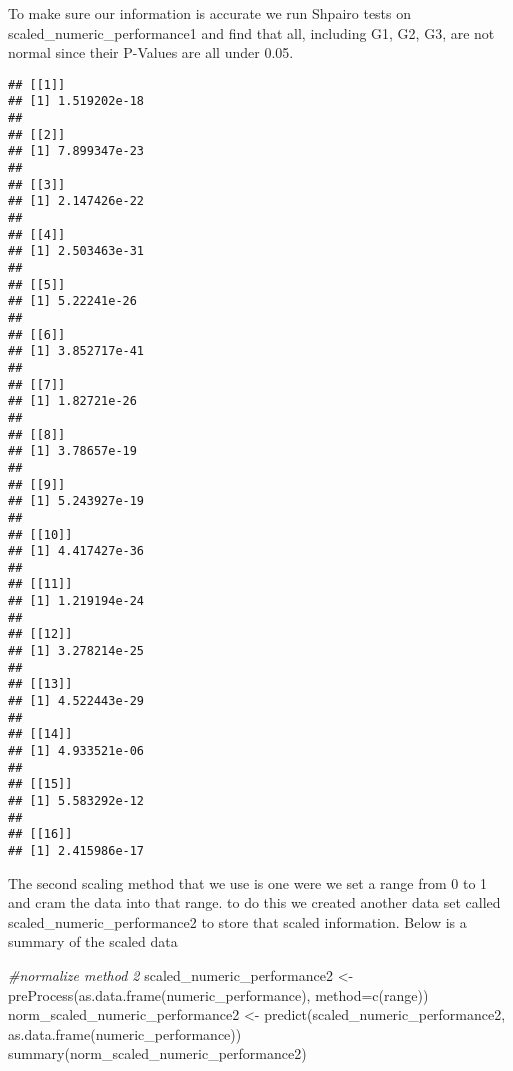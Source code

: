 \documentclass[
]{article}
\newenvironment{Shaded}{\begin{snugshade}}{\end{snugshade}}
\newcommand{\AttributeTok}[1]{\textcolor[rgb]{0.77,0.63,0.00}{#1}}
\newcommand{\CommentTok}[1]{\textcolor[rgb]{0.56,0.35,0.01}{\textit{#1}}}
\newcommand{\ControlFlowTok}[1]{\textcolor[rgb]{0.13,0.29,0.53}{\textbf{#1}}}
\newcommand{\DecValTok}[1]{\textcolor[rgb]{0.00,0.00,0.81}{#1}}
\newcommand{\FunctionTok}[1]{\textcolor[rgb]{0.00,0.00,0.00}{#1}}
\newcommand{\NormalTok}[1]{#1}
\newcommand{\OtherTok}[1]{\textcolor[rgb]{0.56,0.35,0.01}{#1}}
\newcommand{\SpecialCharTok}[1]{\textcolor[rgb]{0.00,0.00,0.00}{#1}}
\newcommand{\StringTok}[1]{\textcolor[rgb]{0.31,0.60,0.02}{#1}}
\begin{document}
To make sure our information is accurate we run Shpairo tests on
scaled\_numeric\_performance1 and find that all, including G1, G2, G3,
are not normal since their P-Values are all under 0.05.

\begin{Shaded}
\end{Shaded}

\begin{verbatim}
## [[1]]
## [1] 1.519202e-18
## 
## [[2]]
## [1] 7.899347e-23
## 
## [[3]]
## [1] 2.147426e-22
## 
## [[4]]
## [1] 2.503463e-31
## 
## [[5]]
## [1] 5.22241e-26
## 
## [[6]]
## [1] 3.852717e-41
## 
## [[7]]
## [1] 1.82721e-26
## 
## [[8]]
## [1] 3.78657e-19
## 
## [[9]]
## [1] 5.243927e-19
## 
## [[10]]
## [1] 4.417427e-36
## 
## [[11]]
## [1] 1.219194e-24
## 
## [[12]]
## [1] 3.278214e-25
## 
## [[13]]
## [1] 4.522443e-29
## 
## [[14]]
## [1] 4.933521e-06
## 
## [[15]]
## [1] 5.583292e-12
## 
## [[16]]
## [1] 2.415986e-17
\end{verbatim}

The second scaling method that we use is one were we set a range from 0
to 1 and cram the data into that range. to do this we created another
data set called scaled\_numeric\_performance2 to store that scaled
information. Below is a summary of the scaled data

\begin{Shaded}
\begin{Highlighting}[]
\CommentTok{\#normalize method 2}
\NormalTok{scaled\_numeric\_performance2 }\OtherTok{\textless{}{-}} \FunctionTok{preProcess}\NormalTok{(}\FunctionTok{as.data.frame}\NormalTok{(numeric\_performance), }\AttributeTok{method=}\FunctionTok{c}\NormalTok{(}\StringTok{\textquotesingle{}range\textquotesingle{}}\NormalTok{))}
\NormalTok{norm\_scaled\_numeric\_performance2 }\OtherTok{\textless{}{-}} \FunctionTok{predict}\NormalTok{(scaled\_numeric\_performance2, }\FunctionTok{as.data.frame}\NormalTok{(numeric\_performance))}
\FunctionTok{summary}\NormalTok{(norm\_scaled\_numeric\_performance2)}
\end{Highlighting}
\end{Shaded}
\end{document}

